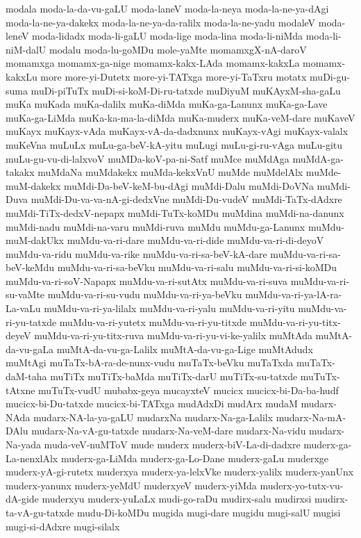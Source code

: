 {modala
moda-la-da-vu-gaLU
moda-laneV
moda-la-neya
moda-la-ne-ya-dAgi
moda-la-ne-ya-dakekx
moda-la-ne-ya-da-ralilx
moda-la-ne-yadu
modaleV
moda-leneV
moda-lidadx
moda-li-gaLU
moda-lige
moda-lina
moda-li-niMda
moda-li-niM-dalU
modalu
moda-lu-goMDu
mole-yaMte
momamxgX-nA-daroV
momamxga
momamx-ga-nige
momamx-kakx-LAda
momamx-kakxLa
momamx-kakxLu
more
more-yi-Dutetx
more-yi-TATxga
more-yi-TaTxru
motatx
muDi-gu-suma
muDi-piTuTx
muDi-si-koM-Di-ru-tatxde
muDiyuM
muKAyxM-sha-gaLu
muKa
muKada
muKa-dalilx
muKa-diMda
muKa-ga-Lanunx
muKa-ga-Lave
muKa-ga-LiMda
muKa-ka-ma-la-diMda
muKa-muderx
muKa-veM-dare
muKaveV
muKayx
muKayx-vAda
muKayx-vA-da-dadxnunx
muKayx-vAgi
muKayx-valalx
muKeVna
muLuLx
muLu-ga-beV-kA-yitu
muLugi
muLu-gi-ru-vAga
muLu-gitu
muLu-gu-vu-di-lalxvoV
muMDa-koV-pa-ni-Satf
muMce
muMdAga
muMdA-ga-takakx
muMdaNa
muMdakekx
muMda-kekxVnU
muMde
muMdelAlx
muMde-muM-dakekx
muMdi-Da-beV-keM-bu-dAgi
muMdi-Dalu
muMdi-DoVNa
muMdi-Duva
muMdi-Du-va-va-nA-gi-dedxVne
muMdi-Du-vudeV
muMdi-TaTx-dAdxre
muMdi-TiTx-dedxV-nepapx
muMdi-TuTx-koMDu
muMdina
muMdi-na-danunx
muMdi-nadu
muMdi-na-varu
muMdi-ruva
muMdu
muMdu-ga-Lanunx
muMdu-muM-dakUkx
muMdu-va-ri-dare
muMdu-va-ri-dide
muMdu-va-ri-di-deyoV
muMdu-va-ridu
muMdu-va-rike
muMdu-va-ri-sa-beV-kA-dare
muMdu-va-ri-sa-beV-keMdu
muMdu-va-ri-sa-beVku
muMdu-va-ri-salu
muMdu-va-ri-si-koMDu
muMdu-va-ri-soV-Napapx
muMdu-va-ri-sutAtx
muMdu-va-ri-suva
muMdu-va-ri-su-vaMte
muMdu-va-ri-su-vudu
muMdu-va-ri-ya-beVku
muMdu-va-ri-ya-lA-ra-La-vaLu
muMdu-va-ri-ya-lilalx
muMdu-va-ri-yalu
muMdu-va-ri-yitu
muMdu-va-ri-yu-tatxde
muMdu-va-ri-yutetx
muMdu-va-ri-yu-titxde
muMdu-va-ri-yu-titx-deyeV
muMdu-va-ri-yu-titx-ruva
muMdu-va-ri-yu-vi-ke-yalilx
muMtAda
muMtA-da-vu-gaLa
muMtA-da-vu-ga-Lalilx
muMtA-da-vu-ga-Lige
muMtAdudx
muMtAgi
muTaTx-bA-ra-de-nunx-vudu
muTaTx-beVku
muTaTxda
muTaTx-daM-taha
muTiTx
muTiTx-baMda
muTiTx-darU
muTiTx-su-tatxde
muTuTx-tAtxne
muTuTx-vudU
mubabx-geya
mucayxteV
mucicx
mucicx-bi-Da-ba-hudf
mucicx-bi-Du-tatxde
mucicx-bi-TATxga
mudAdxDi
mudArx
mudaM
mudarx-NAda
mudarx-NA-la-ya-gaLU
mudarxNa
mudarx-Na-ga-Lalilx
mudarx-Na-mA-DAlu
mudarx-Na-vA-gu-tatxde
mudarx-Na-veM-dare
mudarx-Na-vidu
mudarx-Na-yada
muda-veV-nuMToV
mude
muderx
muderx-biV-La-di-dadxre
muderx-ga-La-nenxlAlx
muderx-ga-LiMda
muderx-ga-Lo-Dane
muderx-gaLu
muderxge
muderx-yA-gi-rutetx
muderxya
muderx-ya-lelxVke
muderx-yalilx
muderx-yanUnx
muderx-yanunx
muderx-yeMdU
muderxyeV
muderx-yiMda
muderx-yo-tutx-vu-dA-gide
muderxyu
muderx-yuLaLx
mudi-go-raDu
mudirx-salu
mudirxsi
mudirx-ta-vA-gu-tatxde
mudu-Di-koMDu
mugida
mugi-dare
mugidu
mugi-salU
mugisi
mugi-si-dAdxre
mugi-silalx
}
